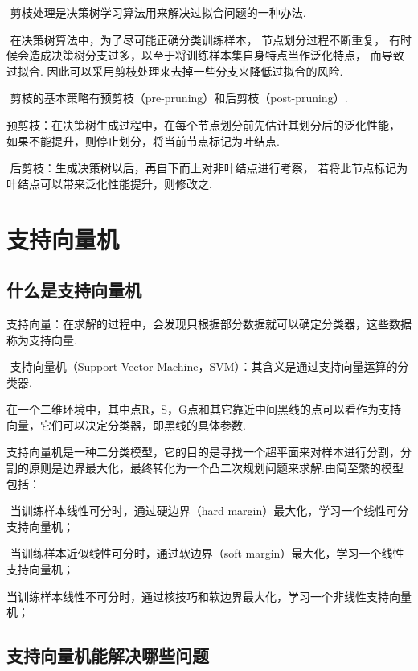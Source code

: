 ​ 剪枝处理是决策树学习算法用来解决过拟合问题的一种办法.

​ 在决策树算法中，为了尽可能正确分类训练样本， 节点划分过程不断重复，
有时候会造成决策树分支过多，以至于将训练样本集自身特点当作泛化特点，
而导致过拟合. 因此可以采用剪枝处理来去掉一些分支来降低过拟合的风险.

​ 剪枝的基本策略有预剪枝（pre-pruning）和后剪枝（post-pruning）.

​ 预剪枝：在决策树生成过程中，在每个节点划分前先估计其划分后的泛化性能，
如果不能提升，则停止划分，将当前节点标记为叶结点.

​ 后剪枝：生成决策树以后，再自下而上对非叶结点进行考察，
若将此节点标记为叶结点可以带来泛化性能提升，则修改之.

\section{ 支持向量机}\label{ux652fux6301ux5411ux91cfux673a}

\subsection{什么是支持向量机}\label{ux4ec0ux4e48ux662fux652fux6301ux5411ux91cfux673a}

​
支持向量：在求解的过程中，会发现只根据部分数据就可以确定分类器，这些数据称为支持向量.

​ 支持向量机（Support Vector
Machine，SVM）：其含义是通过支持向量运算的分类器.

​
在一个二维环境中，其中点R，S，G点和其它靠近中间黑线的点可以看作为支持向量，它们可以决定分类器，即黑线的具体参数.

 

​
支持向量机是一种二分类模型，它的目的是寻找一个超平面来对样本进行分割，分割的原则是边界最大化，最终转化为一个凸二次规划问题来求解.由简至繁的模型包括：

​ 当训练样本线性可分时，通过硬边界（hard
margin）最大化，学习一个线性可分支持向量机；

​ 当训练样本近似线性可分时，通过软边界（soft
margin）最大化，学习一个线性支持向量机；

​
当训练样本线性不可分时，通过核技巧和软边界最大化，学习一个非线性支持向量机；

\subsection{支持向量机能解决哪些问题}\label{ux652fux6301ux5411ux91cfux673aux80fdux89e3ux51b3ux54eaux4e9bux95eeux9898}

